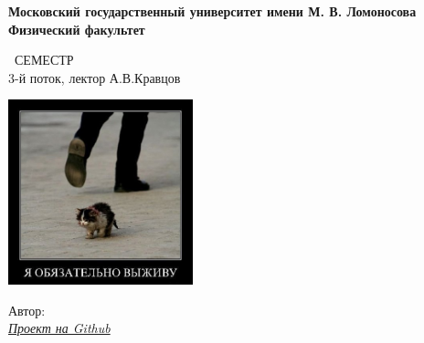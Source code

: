\begin{titlepage}
	\clearpage\thispagestyle{empty}
	\centering
	
	\textbf{Московский государственный университет имени М. В. Ломоносова \\ Физический факультет}
	\vspace{33ex}
	
	{\textbf{\FullCourseNameFirstPart}}
	
	\SemesterNumber\ СЕМЕСТР  \\
	3-й поток, лектор А.В.Кравцов
	\vspace{1ex}
	
	
	
	\ifdefined\nologo\else
	\includegraphics[width=0.4\textwidth]{images/Cat.jpg}
	\fi
	
	\begin{flushright}
		\noindent
		Автор: \href{\VKLink}{\textit{\AuthorInitials}}
		\\
		\href{\GithubLink}{\textit{Проект на Github}}
	\end{flushright}
	
	\vfill
	\CourseDate
	\pagebreak
	
	
	
	
\end{titlepage}
